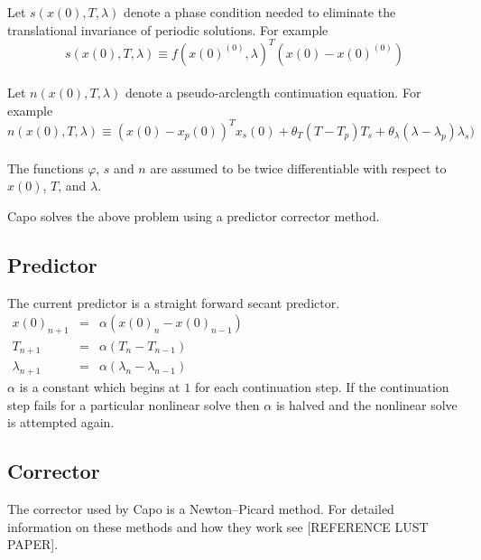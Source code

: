 \documentclass[11pt]{article}
\begin{document}
Let $s(x(0),T,\lambda)$ denote a phase condition needed to eliminate the translational invariance of periodic
solutions.  For example
\begin{equation}
s(x(0),T,\lambda)\equiv f(x(0)^{(0)},\lambda)^T(x(0)-x(0)^{(0)})
\end{equation}\\

Let $n(x(0),T,\lambda)$ denote a pseudo-arclength continuation equation.  For example
\begin{equation}
n(x(0),T,\lambda)\equiv (x(0)-x_p(0))^Tx_s(0)+\theta_T(T-T_p)T_s+\theta_\lambda(\lambda-\lambda_p)\lambda_s)
\end{equation}\\

The functions $\varphi$, $s$ and $n$ are assumed 
to be twice differentiable with 
respect to $x(0)$, $T$, and $\lambda$.

Capo solves the above problem using a predictor corrector method.
\subsection{Predictor}
The current predictor is a straight forward secant predictor.\\
$
\begin{array}{ccl}
x(0)_{n+1} & = & \alpha(x(0)_n-x(0)_{n-1}) \\
T_{n+1} & = & \alpha(T_n-T_{n-1}) \\
\lambda_{n+1} & = & \alpha(\lambda_n-\lambda_{n-1})
\end{array}
$\\
$\alpha$ is a constant which begins at $1$ for each continuation
step.  If the continuation step fails for a particular nonlinear solve
then $\alpha$ is halved and the nonlinear solve is attempted again.  
\subsection{Corrector}
The corrector used by Capo is a Newton--Picard method.  For detailed
information on these methods and how they work see 
[REFERENCE LUST PAPER].\\
\end{document}
